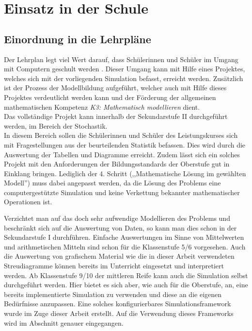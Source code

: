 \section{Einsatz in der Schule}
\subsection{Einordnung in die Lehrpläne}

Der Lehrplan legt viel Wert darauf, dass Schülerinnen und Schüler im Umgang mit Computern geschult werden \cite[Kapitel 4]{sec1}. Dieser Umgang kann mit Hilfe eines Projektes, welches sich mit der vorliegenden Simulation befasst, erreicht werden. Zusätzlich ist der Prozess der Modellbildung aufgeführt, welcher auch mit Hilfe dieses Projektes verdeutlicht werden kann und der Förderung der allgemeinen mathematischen Kompetenz \emph{K3: Mathematisch modellieren} \cite[Kapitel 2.1]{sec1} dient.\\
Das vollständige Projekt kann innerhalb der Sekundarstufe II durchgeführt werden, im Bereich der Stochastik. \\
In diesem Bereich sollen die Schülerinnen und Schüler des Leistungskurses sich mit Fragestellungen aus der beurteilenden Statistik befassen. Dies wird durch die Auswertung der Tabellen und Diagramme erreicht. Zudem lässt sich ein solches Projekt mit den Anforderungen der Bildungsstandards der Oberstufe \cite[Problemlösen mit mathematischen Methoden - Modellbildung]{sec2} gut in Einklang bringen. Lediglich der 4. Schritt (,,Mathematische Lösung im gewählten Modell'') muss dabei angepasst werden, da die Lösung des Problems eine computergestützte Simulation und keine Verkettung bekannter mathematischer Operationen ist.

Verzichtet man auf das doch sehr aufwendige Modellieren des Problems und beschränkt sich auf die Auswertung von Daten, so kann man dies schon in der Sekundarstufe I durchführen. Einfache Auswertungen im Sinne von Mittelwerten und arithmetischen Mitteln sind schon für die Klassenstufe 5/6 vorgesehen. Auch die Auswertung von grafischem Material wie die in dieser Arbeit verwendeten Streudiagramme können bereits im Unterricht eingesetzt und interpretiert werden. Ab Klassenstufe 9/10 der mittleren Reife kann auch die Simulation selbst durchgeführt werden. Hier bietet es sich aber, wie auch für die Oberstufe, an, eine bereits implementierte Simulation zu verwenden und diese an die eigenen Bedürfnisse anzupassen. Eine solches konfigurierbares Simulationsframework wurde im Zuge dieser Arbeit erstellt. Auf die Verwendung dieses Frameworks wird im Abschnitt \emph{} genauer eingegangen.

